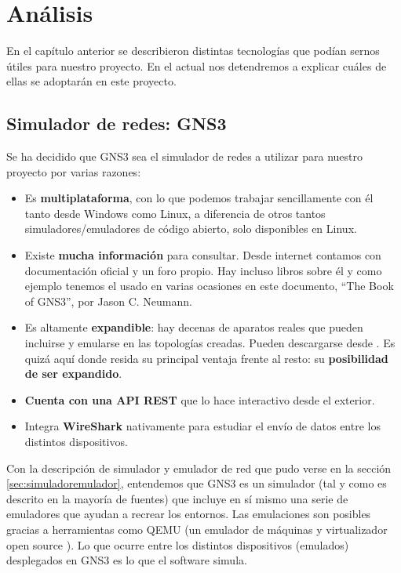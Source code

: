 \chapter{Análisis}\label{chap:Analisis}
En el capítulo anterior se describieron distintas tecnologías que podían sernos útiles para nuestro proyecto. En el actual nos detendremos a explicar cuáles de ellas se adoptarán en este proyecto.

\section{Simulador de redes: GNS3}
Se ha decidido que GNS3 sea el simulador de redes a utilizar para nuestro proyecto por varias razones:
\begin{itemize}
\item Es \textbf{multiplataforma}, con lo que podemos trabajar sencillamente con él tanto desde Windows como Linux, a diferencia de otros tantos simuladores/emuladores de código abierto, solo disponibles en Linux.
\item Existe \textbf{mucha información} para consultar. Desde internet contamos con documentación oficial y un foro propio. Hay incluso libros sobre él y como ejemplo tenemos el usado en varias ocasiones en este documento, ``The Book of GNS3'', por Jason C. Neumann.
\item Es altamente \textbf{expandible}: hay decenas de aparatos reales que pueden incluirse y emularse en las topologías creadas. Pueden descargarse desde . Es quizá aquí donde resida su principal ventaja frente al resto: su \textbf{posibilidad de ser expandido}.
\item \textbf{Cuenta con una API REST} que lo hace interactivo desde el exterior.
\item Integra \textbf{WireShark} nativamente para estudiar el envío de datos entre los distintos dispositivos.
\end{itemize}

Con la descripción de simulador y emulador de red que pudo verse en la sección \ref{sec:simuladoremulador}, entendemos que GNS3 es un simulador (tal y como es descrito en la mayoría de fuentes) que incluye en sí mismo una serie de emuladores que ayudan a recrear los entornos. Las emulaciones son posibles gracias a herramientas como QEMU (un emulador de máquinas y virtualizador open source \cite{qemu}). Lo que ocurre entre los distintos dispositivos (emulados) desplegados en GNS3 es lo que el software simula.

